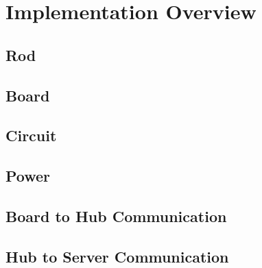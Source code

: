 \chapter{Implementation Overview}

\section{Rod}

\section{Board}

\section{Circuit}

\section{Power}

\section{Board to Hub Communication}

\section{Hub to Server Communication}